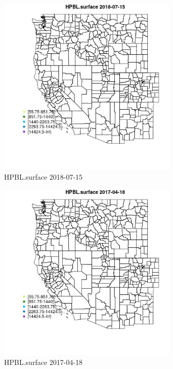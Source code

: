 \begin{figure} 
\centering  
\includegraphics[width=0.77\textwidth]{Code_Outputs/Report_ML_input_PM25_Step4_part_e_de_duplicated_aveswNAs_MapObsHPBLsurface2018-07-15.jpg} 
\caption{\label{fig:Report_ML_input_PM25_Step4_part_e_de_duplicated_aveswNAsMapObsHPBLsurface2018-07-15}HPBL.surface 2018-07-15} 
\end{figure} 
 

\begin{figure} 
\centering  
\includegraphics[width=0.77\textwidth]{Code_Outputs/Report_ML_input_PM25_Step4_part_e_de_duplicated_aveswNAs_MapObsHPBLsurface2017-04-18.jpg} 
\caption{\label{fig:Report_ML_input_PM25_Step4_part_e_de_duplicated_aveswNAsMapObsHPBLsurface2017-04-18}HPBL.surface 2017-04-18} 
\end{figure} 
 

